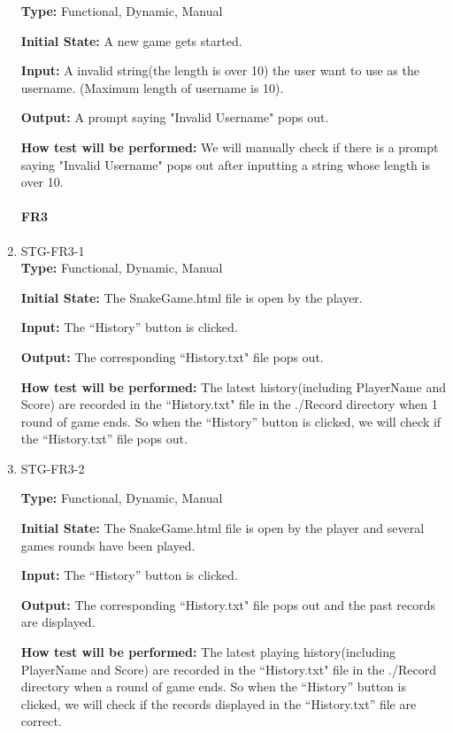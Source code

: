 \documentclass[12pt, titlepage]{article}
\begin{document}
\begin{enumerate}
\textbf{Type:} Functional, Dynamic, Manual

\textbf{Initial State:} A new game gets started.

\textbf{Input:} A invalid string(the length is over 10) the user want to use as the username. (Maximum length of username is 10).

\textbf{Output:} A prompt saying "Invalid Username" pops out.

\textbf{How test will be performed:} We will manually check if there is a prompt saying "Invalid Username" pops out after inputting a string whose length is over 10.


\paragraph{FR3}

\item{STG-FR3-1\\}
\textbf{Type:} Functional, Dynamic, Manual

\textbf{Initial State:} The SnakeGame.html file is open by the player.

\textbf{Input:} The ``History'' button is clicked.

\textbf{Output:} The corresponding ``History.txt" file pops out.

\textbf{How test will be performed:} The latest history(including PlayerName and Score) are recorded in the ``History.txt" file in the ./Record directory when 1 round of game ends. So when the ``History'' button is clicked, we will check if the ``History.txt'' file pops out.

\item{STG-FR3-2\\}

\textbf{Type:} Functional, Dynamic, Manual

\textbf{Initial State:} The SnakeGame.html file is open by the player and several games rounds have been played.

\textbf{Input:} The ``History'' button is clicked.

\textbf{Output:} The corresponding ``History.txt" file pops out and the past records are displayed.

\textbf{How test will be performed:} The latest playing history(including PlayerName and Score) are recorded in the ``History.txt" file in the ./Record directory when a round of game ends. So when the ``History'' button is clicked, we will check if the records displayed in the ``History.txt'' file are correct.


\end{enumerate}
\end{document}
